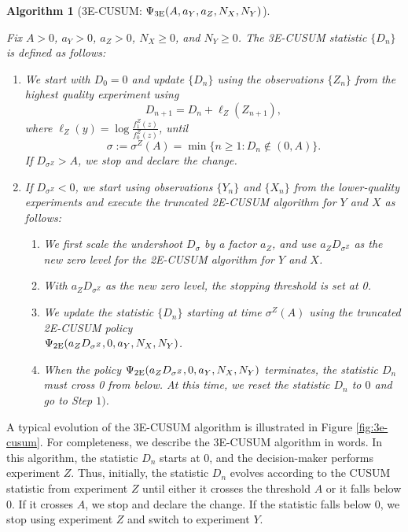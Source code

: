 \documentclass[journal, onecolumn]{IEEEtran}
\newtheorem{algorithm}{Algorithm}
\begin{document}
\begin{algorithm}[3E-CUSUM: $\Psi_{\textup{3E}} (A, a_Y, a_Z, N_X, N_Y)$]
\label{alg:3e-cusum}

Fix $A > 0$, $a_Y > 0$, $a_Z > 0$, $N_X \geq 0$, and $N_Y \geq 0$. The \textup{3E-CUSUM} statistic $\{ D_n \}$ is defined as follows:

\begin{enumerate}
\item We start with $D_0 = 0$ and update $\{ D_n \}$ using the observations $\{ Z_n \}$ from the highest quality experiment using
$$ D_{n + 1}  = D_n + \ell_Z (Z_{n + 1}), $$
where $\ell_Z (y) = \log \frac{f_1^Z (z)}{f_0^Z (z)}$, until 
$$ \sigma := \sigma^Z (A) = \min \{ n \geq 1: D_n \notin (0, A) \}. $$
If $D_{\sigma^Z} > A$, we stop and declare the change.

\item If $D_{\sigma^Z} < 0$, we start using observations $\{ Y_n \}$ and $\{ X_n \}$ from the lower-quality experiments and execute the truncated 2E-CUSUM algorithm for $Y$ and $X$ as follows:

    \begin{enumerate}
    \item We first scale the undershoot $D_\sigma$ by a factor $a_Z$, and use $a_Z D_{\sigma^Z}$ as the new zero level for the \textup{2E-CUSUM} algorithm for $Y$ and $X$.
    
    \item With $a_Z D_{\sigma^Z}$ as the new zero level, the stopping threshold is set at 0.
    
    \item We update the statistic $\{D_n\}$ starting at time $\sigma^Z (A)$ using the truncated \textup{2E-CUSUM} policy \\
    $\Psi_{\textup{2E}} (a_Z D_{\sigma^Z}, 0, a_Y, N_X, N_Y)$.
    
    \item When the policy $\Psi_{\textup{2E}} (a_Z D_{\sigma^Z}, 0, a_Y, N_X, N_Y)$ terminates, the statistic $D_n$ must cross 0 from below. At this time, we reset the statistic $D_n$ to $0$ and go to Step $1)$. 
    \end{enumerate}
\end{enumerate}    
\end{algorithm}

A typical evolution of the 3E-CUSUM algorithm is illustrated in Figure \ref{fig:3e-cusum}. For completeness, we describe the 3E-CUSUM algorithm in words. In this algorithm, the statistic $D_n$ starts at 0, and the decision-maker performs experiment $Z$. Thus, initially, the statistic $D_n$ evolves according to the CUSUM statistic from experiment $Z$ until either it crosses the threshold $A$ or it falls below $0$. If it crosses $A$, we stop and declare the change. If the statistic falls below $0$, we stop using experiment $Z$ and switch to experiment $Y$. 
\end{document}
